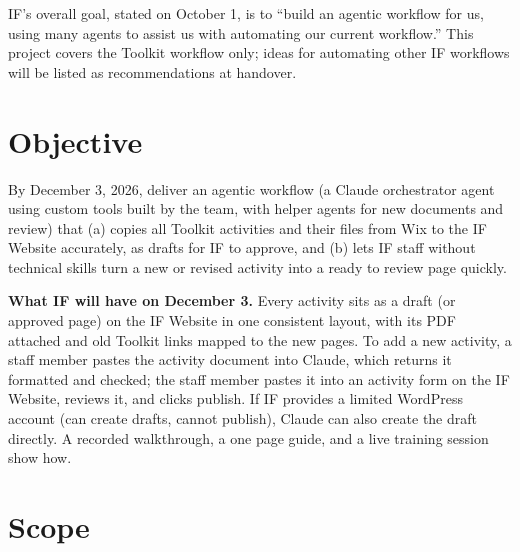 IF's overall goal, stated on October 1, is to ``build an agentic workflow for us, using many agents to assist us with automating our current workflow.'' This project covers the Toolkit workflow only; ideas for automating other IF workflows will be listed as recommendations at handover.

\section{Objective}
By December 3, 2026, deliver an agentic workflow (a Claude orchestrator agent using custom tools built by the team, with helper agents for new documents and review) that (a) copies all Toolkit activities and their files from Wix to the IF Website accurately, as drafts for IF to approve, and (b) lets IF staff without technical skills turn a new or revised activity into a ready to review page quickly.

\textbf{What IF will have on December 3.} Every activity sits as a draft (or approved page) on the IF Website in one consistent layout, with its PDF attached and old Toolkit links mapped to the new pages. To add a new activity, a staff member pastes the activity document into Claude, which returns it formatted and checked; the staff member pastes it into an activity form on the IF Website, reviews it, and clicks publish. If IF provides a limited WordPress account (can create drafts, cannot publish), Claude can also create the draft directly. A recorded walkthrough, a one page guide, and a live training session show how.

\section{Scope}
